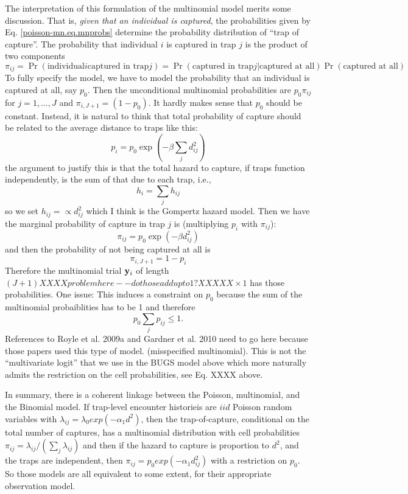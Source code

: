 The interpretation of this formulation of the multinomial model merits
some discussion. That is, {\it given that an individual is captured},
the probabilities given by Eq. \ref{poisson-mn.eq.mnprobs} determine
the probability distribution of ``trap of capture''.  The probability
that individual $i$ is captured in trap $j$ is the product of two
components
\[
\pi_{ij} = \Pr(\mbox{individual} i \mbox{captured in trap} j) = 
 \Pr(\mbox{captured in trap} j | \mbox{captured at all})\Pr(\mbox{captured at all})
\]
To fully specify the model, we have to model the probability that an
individual is captured at all, say $p_0$. Then the unconditional
multinomial probabilities are $p_{0} \pi_{ij}$ for $j=1,\ldots,J$ and
$\pi_{i,J+1} = (1-p_{0})$.  It hardly makes sense that $p_{0}$ should
be constant.  Instead, it is natural to think that total probability
of capture should be related to the average distance to traps like
this:
\[
 p_{i} = p_{0} \exp(-\beta \sum_{j} d_{ij}^2)
\]
the argument to justify this is that the total hazard to capture, if
traps function independently, is the sum of that due to each trap, i.e.,
\[
 h_{i} = \sum_{j} h_{ij}
\]
so we set $h_{ij} = \propto d_{ij}^{2}$ which I think is the Gompertz
hazard model.  
Then we have the marginal probability of capture in trap $j$ is
(multiplying $p_{i}$ with $\pi_{ij}$):
\[
\pi_{ij} =   p_{0}  \exp(-\beta d_{ij}^2)
\]
and then the probability of not being captured at all is 
\[
 \pi_{i,J+1} =  1-p_i 
\]
Therefore the multinomial trial ${\bf y}_{i}$ of length  $(J+1)
XXXX problem here -- do those add up to 1? XXXXX
\times 1$ has those probabilities.  One issue: This induces a
constraint on $p_{0}$ because the sum of the multinomial probaiblities
has to be 1 and therefore 
\[
p_{0} \sum_{j} p_{ij} \le 1.
\]
References to Royle et al. 2009a and Gardner et al. 2010 need to go
here because those papers used this type of model. (misspecified
multinomial). 
This is not the ``multivariate logit'' that
we use in the BUGS model above which more naturally admits the
restriction on the cell probabilities, see Eq. XXXX above.  

In summary, there is a coherent linkage between the Poisson,
multinomial, and the Binomial model. If trap-level encounter
historieis are $iid$ Poisson random variables with $\lambda_{ij} =
\lambda_{0}exp(-\alpha_{1} d^{2})$, then the trap-of-capture,
conditional on the total number of captures, has a multinomial
distribution with cell probabilities $\pi_{ij} =
\lambda_{ij}/(\sum_{j} \lambda_{ij})$ and then if the hazard to
capture is proportion to $d^{2}$, and the traps are independent, then
$\pi_{ij} = p_{0} exp(-\alpha_{1} d_{ij}^{2})$ with a restriction on
$p_{0}$.  So those models are all
equivalent to some extent, for their appropriate observation model.



